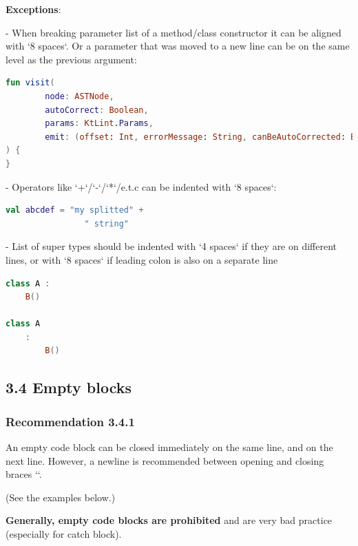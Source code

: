 \textbf{Exceptions}:

- When breaking parameter list of a method/class constructor it can be aligned with `8 spaces`. Or a parameter that was moved to a new line can be on the same level as the previous argument:



\begin{lstlisting}[language=Kotlin]
fun visit(
        node: ASTNode,
        autoCorrect: Boolean,
        params: KtLint.Params,
        emit: (offset: Int, errorMessage: String, canBeAutoCorrected: Boolean) -> Unit
) {
}
\end{lstlisting}


- Operators like `+`/`-`/`*`/e.t.c can be indented with `8 spaces`:



\begin{lstlisting}[language=Kotlin]
val abcdef = "my splitted" +
                " string"
\end{lstlisting}


- List of super types should be indented with `4 spaces` if they are on different lines, or with `8 spaces` if leading colon is also on a separate line



\begin{lstlisting}[language=Kotlin]
class A :
    B()

class A
    :
        B()
\end{lstlisting}


\subsection*{\textbf{3.4 Empty blocks}}

\subsubsection*{\textbf{Recommendation 3.4.1}}
\leavevmode\newline



An empty code block can be closed immediately on the same line, and on the next line. However, a newline is recommended between opening and closing braces `{}`.

(See the examples below.)



\textbf{Generally, empty code blocks are prohibited} and are very bad practice (especially for catch block).

